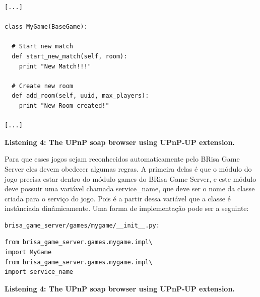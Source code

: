 \documentclass[a4paper]{sbgames}               %
\begin{document}


\begin{lstlisting}[name=soap_browser_new]
[...]

class MyGame(BaseGame):

  # Start new match
  def start_new_match(self, room):
    print "New Match!!!"

  # Create new room
  def add_room(self, uuid, max_players):
    print "New Room created!"

[...]
\end{lstlisting}
\vspace{-2mm}
\scriptsize
\textbf{Listening 4: The UPnP soap browser using UPnP-UP extension.}
\vspace{3mm}
\normalsize

Para que esses jogos sejam reconhecidos automaticamente pelo BRisa Game Server eles devem obedecer algumas regras. A primeira delas é que o módulo do jogo precisa estar dentro do módulo games do BRisa Game Server, e este módulo deve possuir uma variável chamada service\_name, que deve ser o nome da classe criada para o serviço do jogo. Pois é a partir dessa variável que a classe é instânciada dinâmicamente.
Uma forma de implementação pode ser a seguinte:



\begin{verbatim}
brisa_game_server/games/mygame/__init__.py:
\end{verbatim}

\begin{lstlisting}[name=soap_browser_new]
from brisa_game_server.games.mygame.impl\
import MyGame
from brisa_game_server.games.mygame.impl\
import service_name
\end{lstlisting}
\vspace{-2mm}
\scriptsize
\textbf{Listening 4: The UPnP soap browser using UPnP-UP extension.}
\vspace{3mm}
\normalsize

\end{document}
